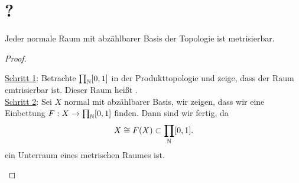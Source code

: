 \section{?}
\begin{theorem}\label{metrisierungsssatz-von-urysohn}
    Jeder normale Raum mit abzählbarer Basis der Topologie ist metrisierbar.
\end{theorem}
\begin{proof}
    \begin{strategy}
        \underline{Schritt 1}: Betrachte $\prod_{\mathbb{N}} [0,1]$ in der Produkttopologie und zeige, dass der Raum emtrisierbar ist. Dieser Raum heißt .  \\
        \underline{Schritt 2}: Sei $X$ normal mit abzählbarer Basis, wir zeigen, dass wir eine Einbettung  $F : X \to  \prod_{\mathbb{N}} [0,1]$ finden.
        Dann sind wir fertig, da 
        \[
            X \cong F(X) \subset \prod_{\mathbb{N}}[0,1]
        .\] 
        ein Unterraum eines metrischen Raumes ist.
    \end{strategy}
\end{proof}
